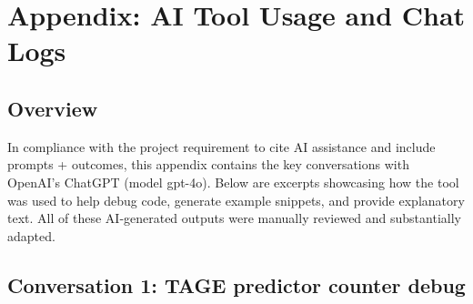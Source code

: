 \documentclass[11pt]{article}
\begin{document}
\appendix
\section{Appendix: AI Tool Usage and Chat Logs}

\subsection{Overview}
In compliance with the project requirement to cite AI assistance and include prompts + outcomes, this appendix contains the key conversations with OpenAI’s ChatGPT (model gpt-4o). Below are excerpts showcasing how the tool was used to help debug code, generate example snippets, and provide explanatory text. All of these AI‐generated outputs were manually reviewed and substantially adapted.

\subsection{Conversation 1: TAGE predictor counter debug}
\end{document}
